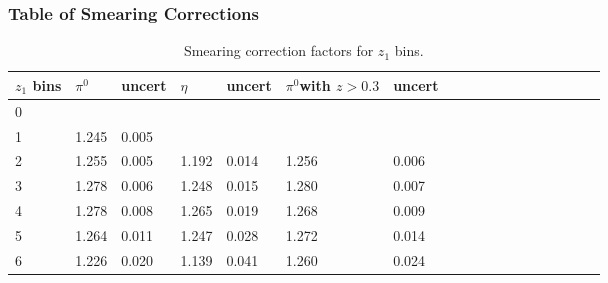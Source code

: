 \subsubsection{Table of Smearing Corrections}
\label{sec:appendixC}
\begin{table}[H]\footnotesize
\centering
\begin{tabular}{|l|l|l|l|l|l|l|l|l|l|l|l|l|l|l|l|l|l|}
\\ \hline
$z_1$ bins & $\pi^0$ &  uncert& $\eta$  & uncert & $\pi^0$\scriptsize{with $z>0.3$} & uncert \\ \hline
0	&		&		&		&		&		&		\\ \hline
1	&	1.245	&	0.005	&		&		&		&		\\ \hline
2	&	1.255	&	0.005	&	1.192	&	0.014	&	1.256	&	0.006	\\ \hline
3	&	1.278	&	0.006	&	1.248	&	0.015	&	1.280	&	0.007	\\ \hline
4	&	1.278	&	0.008	&	1.265	&	0.019	&	1.268	&	0.009	\\ \hline
5	&	1.264	&	0.011	&	1.247	&	0.028	&	1.272	&	0.014	\\ \hline
6	&	1.226	&	0.020	&	1.139	&	0.041	&	1.260	&	0.024	\\ \hline
\end{tabular}
\caption{Smearing correction factors for $z_1$ bins.}
\label{tab:sinz_smearing_info}
\end{table}

